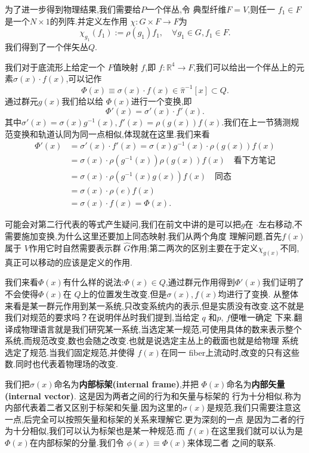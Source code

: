 \documentclass[../main.tex]{subfiles}
\begin{document}
为了进一步得到物理结果,我们需要给$P$一个伴丛,令 典型纤维$F = V$,则任一 $f_1 \in F$是一个$N\times 1$的列阵.并定义左作用 $\chi:G \times F \to F$为\[
  \chi_{g_1}(f_1) := \rho(g_1)f_1,\quad \forall g_1 \in G,f_1 \in F
.\] 
我们得到了一个伴矢丛$Q$.

我们对于底流形上给定一个 $F$值映射 $f$,即 $f:\mathbb{R}^4 \to F$,我们可以给出一个伴丛上的元素$\sigma(x) \cdot f(x)$,可以记作\[
  \Phi(x) \equiv \sigma(x)\cdot f(x) \in \hat{\pi}^{-1}[x] \subset Q
.\] 
通过群元$g(x)$我们给以给 $\Phi(x)$进行一个变换,即\[
\Phi'(x) = \sigma'(x)\cdot f'(x)
.\] 
其中$\sigma'(x) = \sigma(x)g^{-1}(x),f'(x) = \rho(g(x))f(x)$.我们在上一节猜测规范变换和轨道认同为同一点相似,体现就在这里.我们来看
\begin{align*}
  \Phi'(x) &= \sigma'(x)\cdot f'(x) = \sigma(x)g^{-1}(x)\cdot \rho(g(x))f(x) \\
           & = \sigma(x)\cdot \rho(g^{-1}(x))\rho(g(x))f(x)\quad \text{看下方笔记}\\
           & = \sigma(x) \cdot \rho(g^{-1}(x)g(x))f(x) \quad \text{同态}\\
           & = \sigma(x) \cdot \rho(e)f(x) \\
           & = \sigma(x)\cdot f(x) = \Phi(x)
.\end{align*}
\begin{note}
  可能会对第二行代表的等式产生疑问,我们在前文中讲的是可以把$g$在 $\cdot $左右移动,不需要施加变换,为什么这里还要加上同态映射.我们从两个角度
  理解问题,首先$f(x)$属于 $V$作用它时自然需要表示群 $\hat{G}$作用;第二两次的区别主要在于定义$\chi_{g(x)}$不同,真正可以移动的应该是定义的作用.
\end{note}

我们来看$\Phi(x)$有什么样的说法:$\Phi(x) \in Q$,通过群元作用得到$\Phi'(x)$我们证明了不会使得$\Phi(x)$在 $Q$上的位置发生改变.但是$\sigma(x),f(x)$均进行了变换.
从整体来看是某一群元作用到某一系统,只改变系统内的表示,但是实质没有改变.这不就是我们对规范的要求吗？在说明伴丛时我们提到,当给定 $q$ 和$p$, $f$便唯一确定
下来.翻译成物理语言就是我们研究某一系统,当选定某一规范,可使用具体的数来表示整个系统,而规范改变,数也会随之改变.也就是说选定主丛上的截面也就是给物理
系统选定了规范.当我们固定规范,并使得 $f(x)$在同一 fiber上流动时,改变的只有这些数.同时也代表着物理场的改变.

我们把$\sigma(x)$命名为\textbf{内部标架(internal frame)},并把 $\Phi(x)$命名为\textbf{内部矢量(internal vector)}. 这是因为两者之间的行为和矢量与标架的
行为十分相似.称为内部代表着二者又区别于标架和矢量.因为这里的$\sigma(x)$是规范,我们只需要注意这一点,后完全可以按照矢量和标架的关系来理解它.更为深刻的一点
是因为二者的行为十分相似,我们可以认为标架也是某一种规范.而 $f(x)$在这里我们就可以认为是 $\Phi(x)$在内部标架的分量.我们令 $\phi(x)\equiv \Phi(x)$来体现二者
之间的联系.
\end{document}
